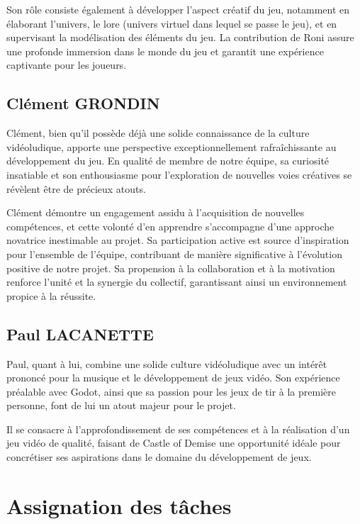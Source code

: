 \documentclass{report}
\begin{document}
	Son rôle consiste également à développer l’aspect créatif du jeu, notamment en élaborant l’univers, le lore (univers virtuel dans lequel se passe le jeu), et en supervisant la modélisation des éléments du jeu. La contribution de Roni assure une profonde immersion dans le monde du jeu et garantit une expérience captivante pour les joueurs.

	\subsection{\normalsize Clément GRONDIN}
	Clément, bien qu’il possède déjà une solide connaissance de la culture vidéoludique, apporte une perspective exceptionnellement rafraîchissante au développement du jeu. En qualité de membre de notre équipe, sa curiosité insatiable et son enthousiasme pour l’exploration de nouvelles voies créatives se révèlent être de précieux atouts. \newline
	
	 Clément démontre un engagement assidu à l’acquisition de nouvelles compétences, et cette volonté d’en apprendre s’accompagne d’une approche novatrice inestimable au projet. Sa participation active est source d’inspiration pour l’ensemble de l’équipe, contribuant de manière significative à l’évolution positive de notre projet. Sa propension à la collaboration et à la motivation renforce l’unité et la synergie du collectif, garantissant ainsi un environnement propice à la réussite.
	 
	 
	
	\subsection{\normalsize Paul LACANETTE}
	Paul, quant à lui, combine une solide culture vidéoludique avec un intérêt prononcé pour la musique et le développement de jeux vidéo. Son expérience préalable avec Godot, ainsi que sa passion pour les jeux de tir à la première personne, font de lui un atout majeur pour le projet. \newline
	
	Il se consacre à l’approfondissement de ses compétences et à la réalisation d’un jeu vidéo de qualité, faisant de Castle of Demise une opportunité idéale pour concrétiser ses aspirations dans le domaine du développement de jeux.


	
	
	
\section{Assignation des tâches}
\end{document}
